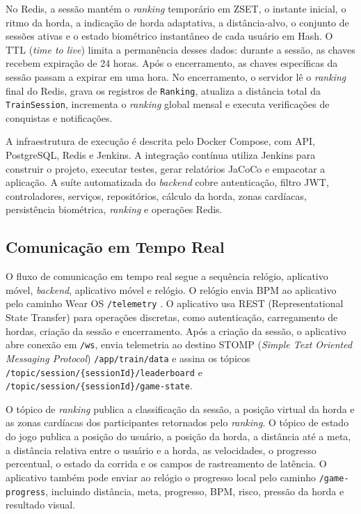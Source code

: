 No Redis, a sessão mantém o \textit{ranking} temporário em ZSET, o instante inicial, o ritmo da horda, a indicação de horda adaptativa, a distância-alvo, o conjunto de sessões ativas e o estado biométrico instantâneo de cada usuário em Hash. O TTL (\textit{time to live}) limita a permanência desses dados: durante a sessão, as chaves recebem expiração de 24 horas. Após o encerramento, as chaves específicas da sessão passam a expirar em uma hora. No encerramento, o servidor lê o \textit{ranking} final do Redis, grava os registros de \texttt{Ranking}, atualiza a distância total da \texttt{TrainSession}, incrementa o \textit{ranking} global mensal e executa verificações de conquistas e notificações.

A infraestrutura de execução é descrita pelo Docker Compose, com API, PostgreSQL, Redis e Jenkins. A integração contínua utiliza Jenkins para construir o projeto, executar testes, gerar relatórios JaCoCo e empacotar a aplicação. A suíte automatizada do \textit{backend} cobre autenticação, filtro JWT, controladores, serviços, repositórios, cálculo da horda, zonas cardíacas, persistência biométrica, \textit{ranking} e operações Redis.

\subsection{Comunicação em Tempo Real}

O fluxo de comunicação em tempo real segue a sequência relógio, aplicativo móvel, \textit{backend}, aplicativo móvel e relógio. O relógio envia BPM ao aplicativo pelo caminho Wear OS \texttt{/telemetry} \cite{androidWearMessageClient}. O aplicativo usa REST (Representational State Transfer) para operações discretas, como autenticação, carregamento de hordas, criação da sessão e encerramento. Após a criação da sessão, o aplicativo abre conexão em \texttt{/ws}, envia telemetria ao destino STOMP (\textit{Simple Text Oriented Messaging Protocol}) \texttt{/app/train/data} e assina os tópicos \texttt{/topic/session/\{sessionId\}/leaderboard} e \texttt{/topic/session/\{sessionId\}/game-state}.

O tópico de \textit{ranking} publica a classificação da sessão, a posição virtual da horda e as zonas cardíacas dos participantes retornados pelo \textit{ranking}. O tópico de estado do jogo publica a posição do usuário, a posição da horda, a distância até a meta, a distância relativa entre o usuário e a horda, as velocidades, o progresso percentual, o estado da corrida e os campos de rastreamento de latência. O aplicativo também pode enviar ao relógio o progresso local pelo caminho \texttt{/game-progress}, incluindo distância, meta, progresso, BPM, risco, pressão da horda e resultado visual.

